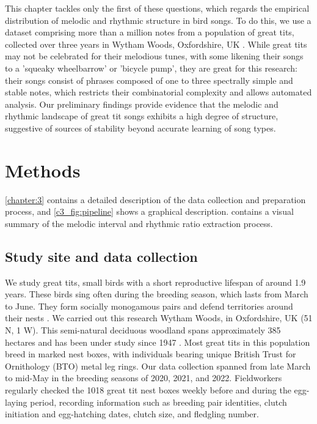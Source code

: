 This chapter tackles only the first of these questions, which regards the empirical distribution of melodic and rhythmic structure in bird songs. To do this, we use a dataset comprising more than a million notes from a population of great tits, collected over three years in Wytham Woods, Oxfordshire, UK \autocite{merinorecalde2023a}. While great tits may not be celebrated for their melodious tunes, with some likening their songs to a 'squeaky wheelbarrow' or 'bicycle pump', they are great for this research: their songs consist of phrases composed of one to three spectrally simple and stable notes, which restricts their combinatorial complexity and allows automated analysis. Our preliminary findings provide evidence that the melodic and rhythmic landscape of great tit songs exhibits a high degree of structure, suggestive of sources of stability beyond accurate learning of song types.

\section{Methods}
\label{c5:methods}

\autoref{chapter:3} contains a detailed description of the data collection and preparation process, and \autoref{c3_fig:pipeline} shows a graphical description.  contains a visual summary of the melodic interval and rhythmic ratio extraction process.

\subsection{Study site and data collection}
We study great tits, small birds with a short reproductive lifespan of around 1.9 years. These birds sing often during the breeding season, which lasts from March to June. They form socially monogamous pairs and defend territories around their nests \parencite{hinde1952}. We carried out this research Wytham Woods, in Oxfordshire, UK (51 N, 1 W). This semi-natural deciduous woodland spans approximately 385 hectares and has been under study since 1947 \parencite{lack1964}. Most great tits in this population breed in marked nest boxes, with individuals bearing unique British Trust for Ornithology (BTO) metal leg rings. Our data collection spanned from late March to mid-May in the breeding seasons of 2020, 2021, and 2022. Fieldworkers regularly checked the 1018 great tit nest boxes weekly before and during the egg-laying period, recording information such as breeding pair identities, clutch initiation and egg-hatching dates, clutch size, and fledgling number.

